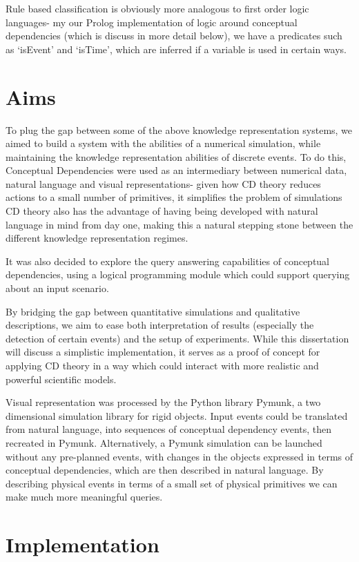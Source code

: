 \documentclass[12pt,MSc,wordcount,twoside]{muthesis}
\begin{document}
    Rule based classification is obviously more analogous to first order logic languages- my our Prolog implementation of logic around conceptual dependencies (which is discuss in more detail below), we have a predicates such as `isEvent' and `isTime', which are inferred if a variable is used in certain ways.

    \chapter{Aims}
    To plug the gap between some of the above knowledge representation systems, we aimed to build a system with the abilities of a numerical simulation, while maintaining the knowledge representation abilities of discrete events. To do this, Conceptual Dependencies were used as an intermediary between numerical data, natural language and visual representations- given how CD theory reduces actions to a small number of primitives, it simplifies the problem of simulations CD theory also has the advantage of having being developed with natural language in mind from day one, making this a natural stepping stone between the different knowledge representation regimes.

    It was also decided to explore the query answering capabilities of conceptual dependencies, using a logical programming module which could support querying about an input scenario.

    By bridging the gap between quantitative simulations and qualitative descriptions, we aim to ease both interpretation of results (especially the detection of certain events) and the setup of experiments. While this dissertation will discuss a simplistic implementation, it serves as a proof of concept for applying CD theory in a way which could interact with more realistic and powerful scientific models.

    Visual representation was processed by the Python library Pymunk, a two dimensional simulation library for rigid objects. Input events could be translated from natural language, into sequences of conceptual dependency events, then recreated in Pymunk. Alternatively, a Pymunk simulation can be launched without any pre-planned events, with changes in the objects expressed in terms of conceptual dependencies, which are then described in natural language. By describing physical events in terms of a small set of physical primitives we can make much more meaningful queries.



    \chapter{Implementation}
    
\end{document}
